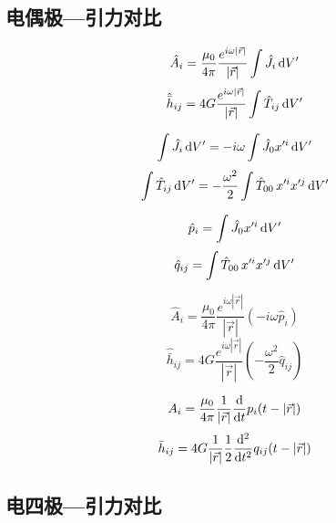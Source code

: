 \subsection{电偶极---引力对比}

\begin{equation}
    \hat{A}_i=\frac{\mu_0}{4\pi}\frac{e^{i\omega\left\lvert\vec{r}\right\rvert}}{\left\lvert\vec{r}\right\rvert}\int\hat{J}_i\,\mathrm{d} V'
\end{equation}
\begin{equation}
    \hat{\bar{h}}_{ij}=4G\frac{e^{i\omega\left\lvert\vec{r}\right\rvert}}{\left\lvert\vec{r}\right\rvert}\int\hat{T}_{ij}\,\mathrm{d} V'
\end{equation}

\begin{equation}
    \int \hat{J}_{i}\,\mathrm{d} V'=-i\omega\int\hat{J}_{0}x'^i\,\mathrm{d} V'
\end{equation}
\begin{equation}
    \int\hat{T}_{ij}\,\mathrm{d} V'=-\frac{\omega^2}{2}\int \hat{T}_{00}\,x'^ix'^j\,\mathrm{d} V'
\end{equation}

\begin{equation}
    \hat{p}_i=\int\hat{J}_{0}x'^i\,\mathrm{d} V'
\end{equation}
\begin{equation}
    \hat{q}_{ij}=\int \hat{T}_{00}\,x'^ix'^j\,\mathrm{d} V'
\end{equation}

\begin{equation}
    \hat{A}_i=\frac{\mu_0}{4\pi}\frac{e^{i\omega\left\lvert\vec{r}\right\rvert}}{\left\lvert\vec{r}\right\rvert}(-i\omega \hat{p}_i)
\end{equation}
\begin{equation}
    \hat{\bar{h}}_{ij}=4G\frac{e^{i\omega\left\lvert\vec{r}\right\rvert}}{\left\lvert\vec{r}\right\rvert}(-\frac{\omega^2}{2}\hat{q}_{ij})
\end{equation}

\begin{equation}
    {A}_i=\frac{\mu_0}{4\pi}\frac{1}{\left\lvert\vec{r}\right\rvert}\frac{\mathrm{d}}{\mathrm{d} t}p_i(t-\left\lvert\vec{r}\right\rvert)
\end{equation}
\begin{equation}
    {\bar{h}}_{ij}=4G\frac{1}{\left\lvert\vec{r}\right\rvert}\frac{1}{2}\frac{\mathrm{d}^2}{\mathrm{d} t^2}q_{ij}(t-\left\lvert\vec{r}\right\rvert)
\end{equation}

\subsection{电四极---引力对比}

